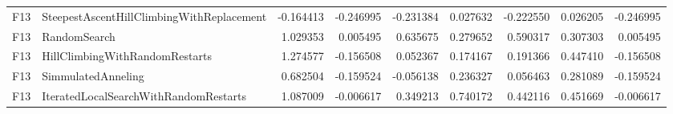 \begin{tabular}{llrrrrrrr}
F13 & SteepestAscentHillClimbingWithReplacement & -0.164413 & -0.246995 & -0.231384 & 0.027632 & -0.222550 & 0.026205 & -0.246995 \\
F13 & RandomSearch & 1.029353 & 0.005495 & 0.635675 & 0.279652 & 0.590317 & 0.307303 & 0.005495 \\
F13 & HillClimbingWithRandomRestarts & 1.274577 & -0.156508 & 0.052367 & 0.174167 & 0.191366 & 0.447410 & -0.156508 \\
F13 & SimmulatedAnneling & 0.682504 & -0.159524 & -0.056138 & 0.236327 & 0.056463 & 0.281089 & -0.159524 \\
F13 & IteratedLocalSearchWithRandomRestarts & 1.087009 & -0.006617 & 0.349213 & 0.740172 & 0.442116 & 0.451669 & -0.006617 \\
\bottomrule
\end{tabular}
